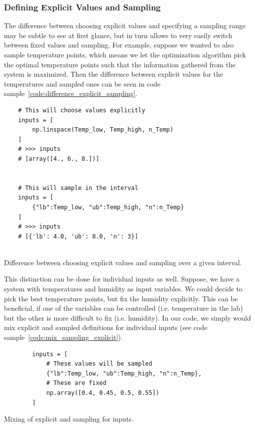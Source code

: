 \documentclass[10pt,A4paper]{article}
\begin{document}
\subsubsection*{Defining Explicit Values and Sampling}
The difference between choosing explicit values and specifying a sampling range may be subtle to see at first glance, but in turn allows to very easily switch between fixed values and sampling.
For example, suppose we wanted to also sample temperature points, which means we let the optimization algorithm pick the optimal temperature points such that the information gathered from the system is maximized.
Then the difference between explicit values for the temperatures and sampled ones can be seen in code sample~\ref{code:difference_explicit_sampling}.\newline
\begin{code}[h]
    \begin{verbatim}
    # This will choose values explicitly
    inputs = [
        np.linspace(Temp_low, Temp_high, n_Temp)
    ]
    # >>> inputs
    # [array([4., 6., 8.])]


    # This will sample in the interval
    inputs = [
        {"lb":Temp_low, "ub":Temp_high, "n":n_Temp}
    ]
    # >>> inputs
    # [{'lb': 4.0, 'ub': 8.0, 'n': 3}]


    \end{verbatim}
    \caption{Difference between choosing explicit values and sampling over a given interval.}
    \label{code:difference_explicit_sampling}
\end{code}%
This distinction can be done for individual inputs as well.
Suppose, we have a system with temperatures and humidity as input variables.
We could decide to pick the best temperature points, but fix the humidity explicitly.
This can be beneficial, if one of the variables can be controlled (i.e. temperature in the lab) but the other is more difficult to fix (i.e. humidity).
In our code, we simply would mix explicit and sampled definitions for individual inputs (see code sample~\ref{code:mix_sampling_explicit}).
\begin{code}[h]
    \begin{verbatim}
        inputs = [
            # These values will be sampled
            {"lb":Temp_low, "ub":Temp_high, "n":n_Temp},
            # These are fixed
            np.array([0.4, 0.45, 0.5, 0.55])
        ]
    \end{verbatim}
    \caption{Mixing of explicit and sampling for inputs.}
    \label{code:mix_sampling_explicit}
\end{code}
%
\end{document}
